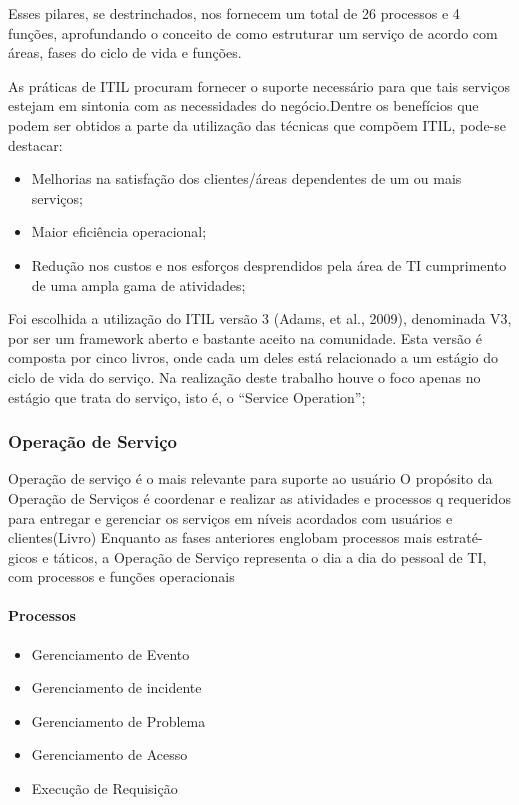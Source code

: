 \cite{itsmfservice}Esses pilares, se destrinchados, nos fornecem um total de 26 processos e 4 funções, aprofundando o conceito de como estruturar um serviço de acordo com áreas, fases do ciclo de vida e funções.



As práticas de ITIL procuram fornecer o suporte necessário para que tais serviços estejam em sintonia com as necessidades do negócio.Dentre os benefícios que podem ser obtidos a parte da utilização das técnicas que compõem ITIL, pode-se destacar:


\begin{itemize}[noitemsep]
	\item Melhorias na satisfação dos clientes/áreas dependentes de um ou mais serviços;
	\item Maior eficiência operacional;
	\item Redução nos custos e nos esforços desprendidos pela área de TI cumprimento de uma ampla gama de atividades;
\end{itemize}

Foi escolhida a utilização do ITIL versão 3 (Adams, et al., 2009), denominada
V3, por ser um framework aberto e bastante aceito na comunidade. Esta versão é
composta por cinco livros, onde cada um deles está relacionado a um estágio do
ciclo de vida do serviço. Na realização deste trabalho houve o foco apenas no
estágio que trata do serviço, isto é, o “Service Operation”;\\

\subsubsection{Operação de Serviço}
Operação de serviço é o mais relevante para suporte ao usuário
O propósito da Operação de Serviços é coordenar e realizar as atividades e processos q
requeridos para entregar e gerenciar os serviços em níveis acordados com usuários e
clientes(Livro)
Enquanto as fases anteriores englobam processos mais estraté-
gicos e táticos, a Operação de Serviço representa o dia a dia do pessoal de TI, com processos e
funções operacionais

\paragraph{Processos}
\begin{itemize}[noitemsep]
	\item Gerenciamento de Evento
	\item Gerenciamento de incidente
	\item Gerenciamento de Problema
	\item Gerenciamento de Acesso
	\item Execução de Requisição
\end{itemize}


